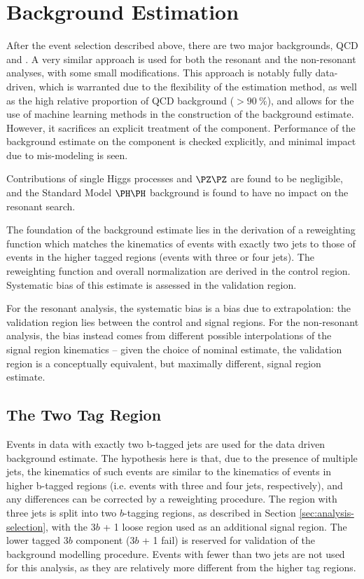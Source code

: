 \FloatBarrier
\clearpage
\section{Background Estimation}
\label{sec:bkgdestimation}
After the event selection described above, there are
two major backgrounds, QCD and \ttbar. A very similar approach is used 
for both the resonant and the non-resonant analyses, with some small modifications. 
This approach is notably fully data-driven, which is warranted due to 
the flexibility of the estimation method, as well as the high relative proportion of 
QCD background ($>90~\%$), and allows for the use of machine learning methods in the construction of
the background estimate. However, it sacrifices an explicit treatment of the
\ttbar component. Performance of the background estimate on the \ttbar component
is checked explicitly, and minimal impact due to \ttbar 
mis-modeling is seen.

Contributions of single Higgs processes and $\PZ\PZ$ are found 
to be negligible, and the Standard Model $\higgs\higgs$ background
is found to have no impact on the resonant search.

The foundation of the background estimate lies in the derivation of a
reweighting function which matches the kinematics of events with exactly two
\btagged jets to those of events in the higher tagged regions (events with three or four 
\btagged jets). The reweighting function and overall normalization are derived in 
the control region. Systematic bias of this estimate is assessed in the validation 
region. 

For the resonant analysis, the systematic bias is a bias due to extrapolation:
the validation region lies between the control and signal regions. For the 
non-resonant analysis, the bias instead comes from different possible interpolations
of the signal region kinematics -- given the choice of nominal estimate, the validation
region is a conceptually equivalent, but maximally different, signal region estimate.

\subsection{The Two Tag Region}

Events in data with exactly two b-tagged jets are used for the data driven 
background estimate. The hypothesis here is that, due to the presence of 
multiple \btagged jets, the kinematics of such events are similar to the 
kinematics of events in higher b-tagged regions (i.e. events with three and 
four \btagged jets, respectively), and any differences can be corrected by a 
reweighting procedure. The region with three \btagged jets is split into 
two $b$-tagging regions, as described in Section \ref{sec:analysis-selection}, 
with the 3$b$ + 1 loose region used as an additional signal 
region. The lower tagged 3$b$ component (3$b$ + 1 fail) is reserved for validation
of the background modelling procedure. Events with fewer than two \btagged jets are not 
used for this analysis, as they are relatively more different from the higher tag regions.

